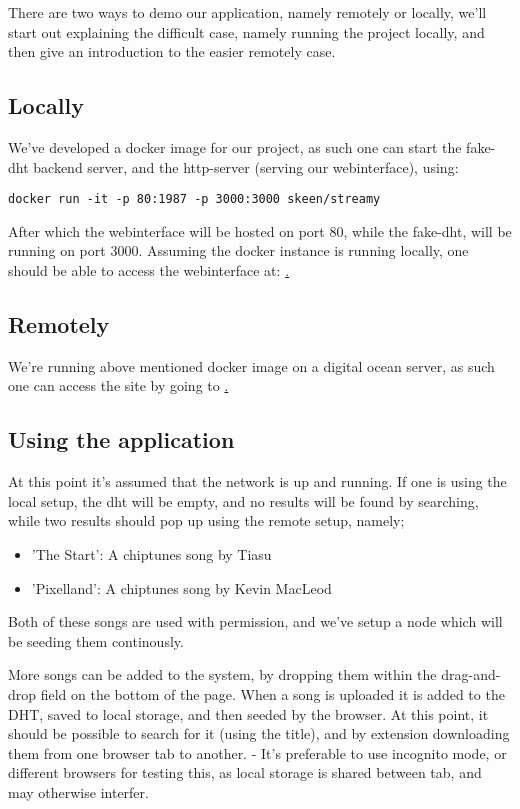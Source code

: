 
There are two ways to demo our application, namely remotely or locally, we'll
start out explaining the difficult case, namely running the project locally,
and then give an introduction to the easier remotely case.

\subsection{Locally}
We've developed a docker image for our project, as such one can start the 
fake-dht backend server, and the http-server (serving our webinterface), using:
\begin{verbatim}
docker run -it -p 80:1987 -p 3000:3000 skeen/streamy
\end{verbatim}
After which the webinterface will be hosted on port 80, while the fake-dht,
will be running on port 3000. Assuming the docker instance is running locally,
one should be able to access the webinterface at: \href{http://localhost}.

\subsection{Remotely}
We're running above mentioned docker image on a digital ocean server, as such
one can access the site by going to \href{http://46.101.226.102}.

\subsection{Using the application}
At this point it's assumed that the network is up and running. If one is using 
the local setup, the dht will be empty, and no results will be found by
searching, while two results should pop up using the remote setup, namely;
\begin{itemize}
\item 'The Start': A chiptunes song by Tiasu
\item 'Pixelland': A chiptunes song by Kevin MacLeod
\end{itemize}
Both of these songs are used with permission, and we've setup a node which will
be seeding them continously.

More songs can be added to the system, by dropping them within the drag-and-drop
field on the bottom of the page. When a song is uploaded it is added to the DHT,
saved to local storage, and then seeded by the browser.
At this point, it should be possible to search for it (using the title), and by
extension downloading them from one browser tab to another.
\newline
- It's preferable to use incognito mode, or different browsers for testing this,
as local storage is shared between tab, and may otherwise interfer.

